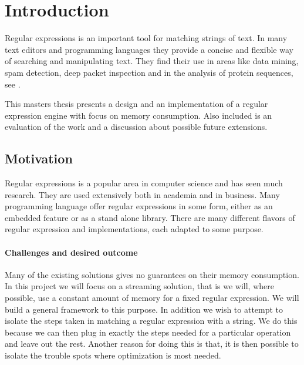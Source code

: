 \section{Introduction}
Regular expressions is an important tool for matching strings of
text. In many text editors and programming languages they provide a
concise and flexible way of searching and manipulating text. They find
their use in areas like data mining, spam detection, deep packet
inspection and in the analysis of protein sequences, see
\cite{pedersen2010}.

This masters thesis presents a design and an implementation of a
regular expression engine with focus on memory consumption. Also 
included is an evaluation of the work and a discussion about possible
future extensions.



\subsection{Motivation}

Regular expressions is a popular area in computer science and has seen
much research. They are used extensively both in academia and in
business. Many programming language offer regular expressions in some
form, either as an embedded feature or as a stand alone
library. There are many different flavors of regular expression and
implementations, each adapted to some purpose. 


\paragraph{Challenges and desired outcome}
Many of the existing solutions gives no guarantees on their memory
consumption. In this project we will focus on a streaming solution,
that is we will, where possible, use a constant amount of memory for a
fixed regular expression. We will build a general framework to this
purpose. In addition we wish to attempt to isolate the steps taken in
matching a regular expression with a string. We do this because we can
then plug in exactly the steps needed for a particular operation and
leave out the rest. Another reason for doing this is that, it is then
possible to isolate the trouble spots where optimization is most
needed. 


